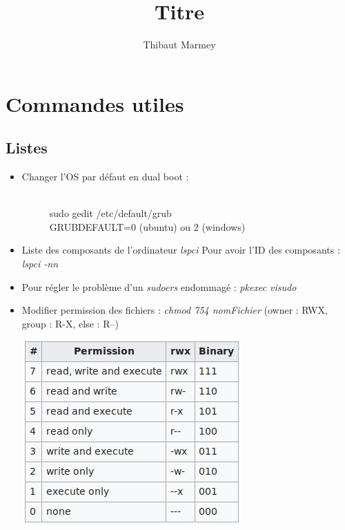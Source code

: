 \documentclass[12pt,a4paper]{article}
\author{Thibaut Marmey}
\title{Titre}
\begin{document}
	\maketitle

\section{Commandes utiles}
\subsection{Listes}
\begin{itemize}
\item
\begin{description}
\item [Changer l'OS par défaut en dual boot :] \hfill \\sudo gedit /etc/default/grub \\GRUB\textunderscore DEFAULT=0 (ubuntu) ou 2 (windows) 
\end{description}
\item Liste des composants de l'ordinateur \textit{lspci}
\newline Pour avoir l'ID des composants : \textit{lspci -nn}
\item Pour régler le problème d'un \textit{sudoers} endommagé : \textit{pkexec visudo}
\item Modifier permission des fichiers : \textit{chmod 754 nomFichier} (owner : RWX, group : R-X, else : R--) 
\begin{center}
\includegraphics[scale=0.5]{chmod_permission}
\end{center}

\end{itemize}
\end{document}
